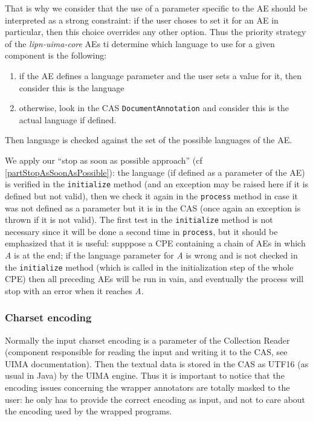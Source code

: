 \documentclass{article}
\newenvironment{xenumerate}{
\begin{enumerate}
  \setlength{\itemsep}{.3\baselineskip}
  \setlength{\topsep}{0pt}
  \setlength{\parskip}{0pt}
  \setlength{\parsep}{0pt}
}{\end{enumerate}}
\newcommand{\uimaModule}{{\em lipn-uima-core}\xspace}
\begin{document}
That is why we consider that the use of a parameter specific to the AE should be interpreted as a strong constraint: if the user choses to set it for an AE in particular, then this choice overrides any other option. Thus the priority strategy of the \uimaModule AEs ti determine which language to use for a given component is the following: 
\begin{xenumerate}
\item if the AE defines a language parameter and the user sets a value for it, then consider this is the language
\item otherwise, look in the CAS {\tt DocumentAnnotation} and consider this is the actual language if defined.
\end{xenumerate}

Then language is checked against the set of the possible languages of the AE.

We apply our ``stop as soon as possible approach'' (cf \ref{partStopAsSoonAsPossible}): the language (if defined as a parameter of the AE) is verified in the {\tt initialize} method (and an exception may be raised here if it is defined but not valid), then we check it again in the {\tt process} method in case it was not defined as a parameter but it is in the CAS (once again an exception is thrown if it is not valid). The first test in the {\tt initialize} method is not necessary since it will be done a second time in {\tt process}, but it should be emphasized that it is useful: supppose a CPE containing a chain of AEs in which {\it A} is at the end; if the language parameter for {\it A} is wrong and is not checked in the {\tt initialize} method (which is called in the initialization step of the whole CPE) then all preceding AEs will be run in vain, and eventually the process will stop with an error when it reaches {\it A}.


\subsubsection{Charset encoding}
\label{partUimaCoreEncoding}


Normally the input charset encoding is a parameter of the Collection Reader (component responsible for reading the input and writing it to the CAS, see UIMA documentation). Then the textual data is stored in the CAS as UTF16 (as usual in Java) by the UIMA engine. Thus it is important to notice that the encoding issues concerning the wrapper annotators are totally masked to the user: he only has to provide the correct encoding as input, and not to care about the encoding used by the wrapped programs. 
\end{document}
